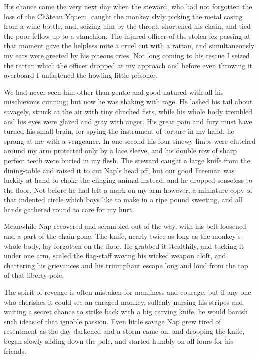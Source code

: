\documentclass[12pt]{book}
\begin{document}
His chance came the very next day when the steward, who had not forgotten
the loss of the Château Yquem, caught the monkey slyly picking the metal casing
from a wine bottle, and, seizing him by the throat, shortened his chain, and tied
the poor fellow up to a stanchion. The injured officer of the stolen fez passing at
that moment gave the helpless mite a cruel cut with a rattan, and simultaneously
my ears were greeted by his piteous cries. Not long coming to his rescue I seized
the rattan which the officer dropped at my approach and before even throwing it
overboard I unfastened the howling little prisoner.

We had never seen him other than gentle and good‐natured with all his
mischievous cunning; but now he was shaking with rage. He lashed his tail about
savagely, struck at the air with tiny clinched fists, while his whole body trembled
and his eyes were glazed and gray with anger. His great pain and fury must
have turned his small brain, for spying the instrument of torture in my hand,
he sprang at me with a vengeance. In one second his four sinewy limbs were
clutched around my arm protected only by a lace sleeve, and his double row of
sharp perfect teeth were buried in my flesh. The steward caught a large knife from
the dining‐table and raised it to cut Nap’s head off, but our good Freeman was
luckily at hand to choke the clinging animal instead, and he dropped senseless to
the floor. Not before he had left a mark on my arm however, a miniature copy of
that indented circle which boys like to make in a ripe pound sweeting, and all
hands gathered round to care for my hurt.

Meanwhile Nap recovered and scrambled out of the way, with his belt loosened
and a part of the chain gone. The knife, nearly twice as long as the monkey’s whole
body, lay forgotten on the floor. He grabbed it stealthily, and tucking it under
one arm, scaled the flag‐staff waving his wicked weapon aloft, and chattering
his grievances and his triumphant escape long and loud from the top of that
liberty‐pole.

The spirit of revenge is often mistaken for manliness and courage, but if any
one who cherishes it could see an enraged monkey, sullenly nursing his stripes
and waiting a secret chance to strike back with a big carving knife, he would
banish such ideas of that ignoble passion. Even little savage Nap grew tired of
resentment as the day darkened and a storm came on, and dropping the knife,
began slowly sliding down the pole, and started humbly on all‐fours for his
friends.
\end{document}
